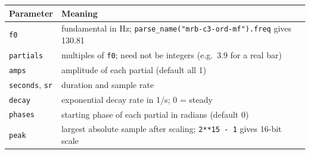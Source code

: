 \documentclass[
  10pt,
]{article}
\begin{document}
\begin{longtable}[]{@{}ll@{}}
\toprule
\begin{minipage}[b]{0.47\columnwidth}\raggedright
Parameter\strut
\end{minipage} &
\begin{minipage}[b]{0.47\columnwidth}\raggedright
Meaning\strut
\end{minipage}\tabularnewline
\midrule
\endhead
\begin{minipage}[t]{0.47\columnwidth}\raggedright
\texttt{f0}\strut
\end{minipage} &
\begin{minipage}[t]{0.47\columnwidth}\raggedright
fundamental in Hz;
\texttt{parse\_name("mrb-c3-ord-mf").freq} gives
130.81\strut
\end{minipage}\tabularnewline
\begin{minipage}[t]{0.47\columnwidth}\raggedright
\texttt{partials}\strut
\end{minipage} &
\begin{minipage}[t]{0.47\columnwidth}\raggedright
multiples of \texttt{f0}; need not be integers (e.g.~3.9 for
a real bar)\strut
\end{minipage}\tabularnewline
\begin{minipage}[t]{0.47\columnwidth}\raggedright
\texttt{amps}\strut
\end{minipage} &
\begin{minipage}[t]{0.47\columnwidth}\raggedright
amplitude of each partial (default all 1)\strut
\end{minipage}\tabularnewline
\begin{minipage}[t]{0.47\columnwidth}\raggedright
\texttt{seconds}, \texttt{sr}\strut
\end{minipage} &
\begin{minipage}[t]{0.47\columnwidth}\raggedright
duration and sample rate\strut
\end{minipage}\tabularnewline
\begin{minipage}[t]{0.47\columnwidth}\raggedright
\texttt{decay}\strut
\end{minipage} &
\begin{minipage}[t]{0.47\columnwidth}\raggedright
exponential decay rate in 1/s; 0 = steady\strut
\end{minipage}\tabularnewline
\begin{minipage}[t]{0.47\columnwidth}\raggedright
\texttt{phases}\strut
\end{minipage} &
\begin{minipage}[t]{0.47\columnwidth}\raggedright
starting phase of each partial in radians (default 0)\strut
\end{minipage}\tabularnewline
\begin{minipage}[t]{0.47\columnwidth}\raggedright
\texttt{peak}\strut
\end{minipage} &
\begin{minipage}[t]{0.47\columnwidth}\raggedright
largest absolute sample after scaling; \texttt{2**15\ -\ 1}
gives 16-bit scale\strut
\end{minipage}\tabularnewline
\bottomrule
\end{longtable}
\end{document}
